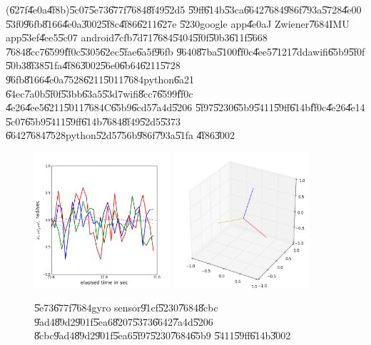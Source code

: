 \clearpage%

\begin{case}
(\U{627f}\U{4e0a}\U{4f8b})\U{5c07}\U{5e73}\U{677f}\U{7684}\U{8f49}\U{52d5}%
\U{59ff}\U{614b}\U{53ca}\U{6642}\U{7684}\U{986f}\U{793a}\U{5728}\U{4e00}%
\U{53f0}\U{96fb}\U{8166}\U{4e0a}\U{3002}\U{5f8c}\U{4f86}\U{6211}\U{627e}%
\U{5230}google app\U{4e0a}J Zwiener\U{7684}IMU app\U{53ef}\U{4ee5}\U{5c07}%
android\U{7cfb}\U{7d71}\U{7684}\U{5404}\U{5f0f}\U{50b3}\U{611f}\U{5668}%
\U{7684}\U{8cc7}\U{6599}\U{ff0c}\U{5305}\U{62ec}\U{5fae}\U{6a5f}\U{96fb}%
\U{9640}\U{87ba}\U{5100}\U{ff0c}\U{4ee5}\U{7121}\U{7dda}wifi\U{65b9}\U{5f0f}%
\U{50b3}\U{8f38}\U{51fa}\U{4f86}\U{3002}\U{56e0}\U{6b64}\U{6211}\U{5728}%
\U{96fb}\U{8166}\U{4e0a}\U{7528}\U{6211}\U{5011}\U{7684}python\U{6a21}%
\U{64ec}\U{7a0b}\U{5f0f}\U{53bb}\U{63a5}\U{53d7}wifi\U{8cc7}\U{6599}\U{ff0c}%
\U{4e26}\U{4ee5}\U{6211}\U{5011}\U{7684}C\U{65b9}\U{6cd5}\U{7a4d}\U{5206}%
\U{5f97}\U{5230}\U{65b9}\U{5411}\U{59ff}\U{614b}\U{ff0c}\U{4e26}\U{4e14}%
\U{5c07}\U{65b9}\U{5411}\U{59ff}\U{614b}\U{7684}\U{8f49}\U{52d5}\U{5373}%
\U{6642}\U{7684}\U{7528}python\U{52d5}\U{756b}\U{986f}\U{793a}\U{51fa}%
\U{4f86}\U{3002}\newline
\begin{figure}[th]
\caption{\U{5e73}\U{677f}\U{7684}gyro sensor\U{91cf}\U{5230}\U{7684}\U{8cbc}%
\U{9ad4}\U{89d2}\U{901f}\U{5ea6}\U{8207}\U{5373}\U{6642}\U{7a4d}\U{5206}%
\U{8cbc}\U{9ad4}\U{89d2}\U{901f}\U{5ea6}\U{5f97}\U{5230}\U{7684}\U{65b9}%
\U{5411}\U{59ff}\U{614b}\U{3002}}
\begin{center}
\includegraphics[width=0.45\textwidth]{./figs/Zwiener_1.png}%
\includegraphics[width=0.45\textwidth]{./figs/Zwiener_2.png}

\end{center}
\end{figure}
\end{case}
